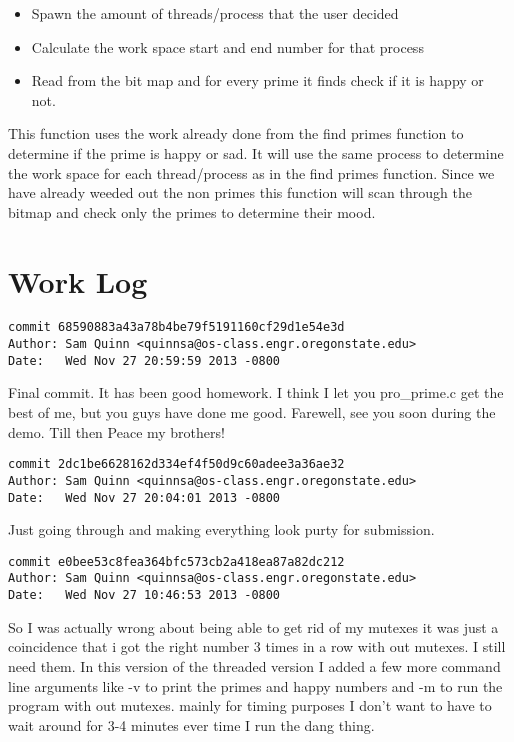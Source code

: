 \documentclass[letterpaper,10pt,notitlepage,fleqn]{article}
\begin{document}
\begin{itemize}
\item Spawn the amount of threads/process that the user decided
\item Calculate the work space start and end number for that process
\item Read from the bit map and for every prime it finds check if it is happy or not.
\end{itemize}

This function uses the work already done from the find primes function to determine if the prime is happy or sad. It will use the same process to determine the work space for each thread/process as in the find primes function. Since we have already weeded out the non primes this function will scan through the bitmap and check only the primes to determine their mood.



 
\section*{Work Log}

\begin{verbatim}
commit 68590883a43a78b4be79f5191160cf29d1e54e3d
Author: Sam Quinn <quinnsa@os-class.engr.oregonstate.edu>
Date:   Wed Nov 27 20:59:59 2013 -0800
\end{verbatim}
    Final commit. It has been good homework. I think I let you pro\_prime.c get the best of me, but you guys have done me good. Farewell, see you soon during the demo. Till then Peace my brothers!
\begin{verbatim}
commit 2dc1be6628162d334ef4f50d9c60adee3a36ae32
Author: Sam Quinn <quinnsa@os-class.engr.oregonstate.edu>
Date:   Wed Nov 27 20:04:01 2013 -0800
\end{verbatim}
    Just going through and making everything look purty for submission.

\begin{verbatim}
commit e0bee53c8fea364bfc573cb2a418ea87a82dc212
Author: Sam Quinn <quinnsa@os-class.engr.oregonstate.edu>
Date:   Wed Nov 27 10:46:53 2013 -0800
\end{verbatim}
    So I was actually wrong about being able to get rid of my mutexes it was just a coincidence that i got the right number 3 times in a row with out mutexes. I still need them.
    In this version of the threaded version I added a few more command line arguments like -v to print the primes and happy numbers and -m to run the program with out mutexes. mainly for timing purposes I don't want to have to wait around for 3-4 minutes ever time I run the dang thing.
\end{document}
